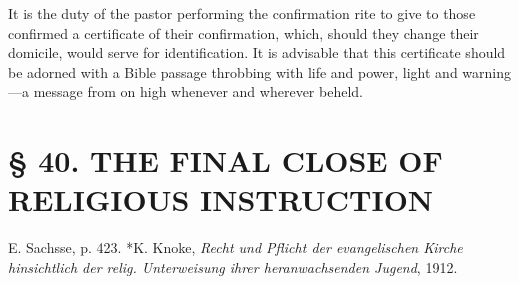 It is the duty of the pastor performing the confirmation rite to give to those confirmed a certificate of their confirmation, which, should they change their domicile, would serve for identification. It is advisable that this certificate should be adorned with a Bible passage throbbing with life and power, light and warning—a message from on high whenever and wherever beheld.

\chapter[§ 40. THE FINAL CLOSE]{§ 40. THE FINAL CLOSE OF RELIGIOUS INSTRUCTION}

E. Sachsse, p. 423. *K. Knoke, \emph{Recht und Pflicht der evangelischen Kirche hinsichtlich der relig. Unterweisung ihrer heranwachsenden Jugend}, 1912.

